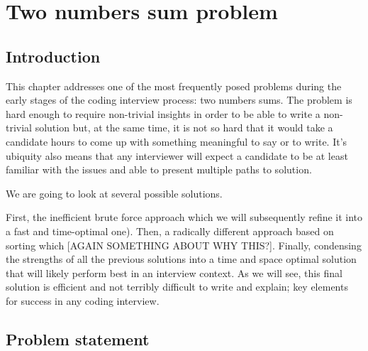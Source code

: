 %


\chapter{Two numbers sum problem}
\label{ch:two_numbers_sum}
\section*{Introduction}
This chapter addresses one of the most frequently posed problems during the early stages of the coding interview process: two numbers sums.  The problem is hard enough to require non-trivial insights in order to be able to write a non-trivial solution but, at the same time, it is not so hard that it would take a candidate hours to come up with something meaningful to say or to write. It's ubiquity also means that any interviewer will expect a candidate to be at least familiar with the issues and able to present multiple paths to solution. 

We are going to look at several possible solutions.

First, the inefficient brute force approach which we will subsequently refine it into a fast and time-optimal one).
Then,  a radically different approach based on sorting which [AGAIN SOMETHING ABOUT WHY THIS?].
Finally, condensing the strengths of all the previous solutions into a time and space optimal solution that will likely perform best in an interview context. As we will see, this final solution is efficient and not terribly difficult to write and explain; key elements for success in any coding interview.


\section{Problem statement}

